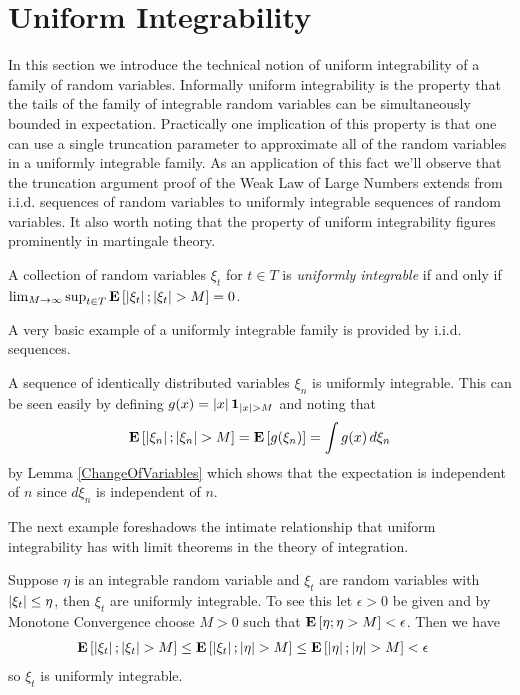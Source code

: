 \section{Uniform Integrability}

In this section we introduce the technical notion of uniform
integrability of a family of random variables.  Informally uniform
integrability is the property that the tails of the family of
integrable random
variables can be simultaneously bounded in expectation.  Practically
one implication of this property is that one can use a single
truncation parameter to approximate all of the random variables in a
uniformly integrable family.  As an application of this fact we'll
observe that the truncation argument proof of the Weak Law of Large
Numbers extends from i.i.d. sequences of random variables to uniformly
integrable sequences of random variables.  It also worth noting that
the property of uniform integrability figures prominently in
martingale theory.

\begin{defn}A collection of random variables $\xi_t$ for $t \in T$ is
  \emph{uniformly integrable} if and only if $\lim_{M \to \infty}
  \sup_{t \in T} \textbf{E}\left[\left \vert \xi_t \right \vert ; \left \vert \xi_t \right \vert > M\right] = 0$.
\end{defn}

A very basic example of a uniformly integrable family is provided by
i.i.d. sequences.
\begin{examp}A sequence of identically distributed variables $\xi_n$ is
  uniformly integrable.  This can be seen easily by defining $g(x) =
  \left \vert x \right \vert\textbf{1}_{\left \vert x \right \vert>M}$ and noting that 
\begin{align*}
\textbf{E}\left[\left \vert \xi_n \right \vert ; \left \vert \xi_n \right \vert > M\right] = \textbf{E}\left[g(\xi_n)\right] =
\int g(x) \, d\xi_n
\end{align*}
by Lemma \ref{ChangeOfVariables} which shows that the expectation is
independent of $n$ since $d\xi_n$ is independent of $n$.
\end{examp}

The next example foreshadows the intimate relationship that uniform
integrability has with limit theorems in the theory of integration.
\begin{examp}\label{DominatedImpliesUniformlyIntegrable}Suppose $\eta$ is an integrable random variable and $\xi_t$ are random variables with $\left \vert \xi_t \right \vert
  \leq \eta$, then $\xi_t$ are uniformly integrable.  To see this let
  $\epsilon >0$ be given and by Monotone Convergence choose $M > 0$
  such that $\textbf{E}\left[\eta; \eta > M\right] < \epsilon$.  Then we have
\begin{align*}
\textbf{E}\left[\left \vert \xi_t \right \vert; \left \vert \xi_t \right \vert>M\right] &\leq
\textbf{E}\left[\left \vert \xi_t \right \vert; \left \vert \eta \right \vert>M\right] \leq \textbf{E}\left[\left \vert \eta \right \vert;
  \left \vert \eta \right \vert>M\right] < \epsilon
\end{align*}
so $\xi_t$ is uniformly integrable.
\end{examp}

